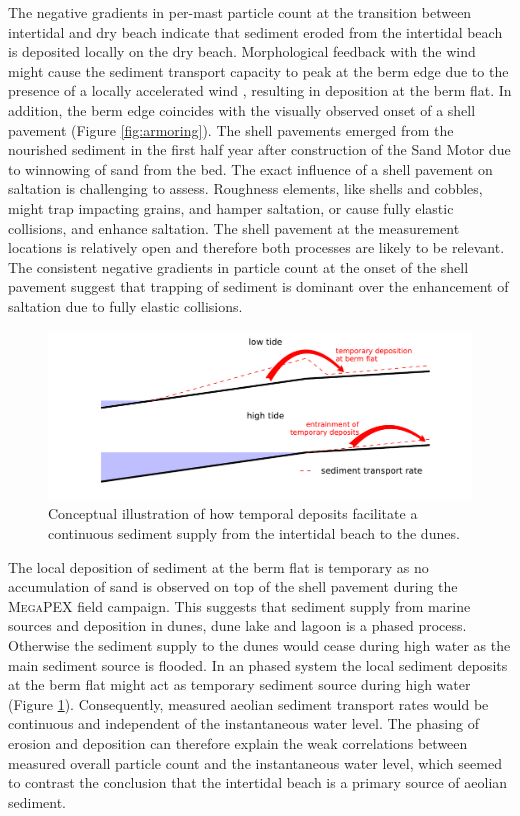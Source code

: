 The negative gradients in per-mast particle count at the transition
between intertidal and dry beach indicate that sediment eroded from
the intertidal beach is deposited locally on the dry
beach. Morphological feedback with the wind might cause
the sediment transport capacity to peak at the berm edge due to the
presence of a locally accelerated wind \citep[i.e. jet
flow;][]{Hesp2016}, resulting in deposition at the berm flat. In
addition, the berm edge coincides with the visually observed onset of
a shell pavement (Figure \ref{fig:armoring}).  The shell
pavements emerged from the nourished sediment in the first half year
after construction of the Sand Motor \citep{Hoonhout2017a} due to
winnowing of sand from the bed. The exact influence of a shell
pavement on saltation is challenging to assess. Roughness elements,
like shells and cobbles, might trap impacting grains, and hamper
saltation, or cause fully elastic collisions, and enhance
saltation. The shell pavement at the measurement locations is
relatively open and therefore both processes are likely to be
relevant. The consistent negative gradients in particle count at the
onset of the shell pavement suggest that trapping of sediment is
dominant over the enhancement of saltation due to fully elastic
collisions.

\begin{figure}
 \centering
  \includegraphics[width=\columnwidth]{../Figures/temporal_deposits}
  \caption{Conceptual illustration of how temporal deposits facilitate
    a continuous sediment supply from the intertidal beach to the
    dunes.}
  \label{fig:temporal_deposits}
\end{figure}

The local deposition of sediment at the berm flat is temporary as no
accumulation of sand is observed on top of the shell pavement during
the \textsc{MegaPEX} field campaign. This suggests that sediment
supply from marine sources and deposition in dunes, dune lake and
lagoon is a phased process. Otherwise the sediment supply to the dunes
would cease during high water as the main sediment source is
flooded. In an phased system the local sediment deposits at the berm
flat might act as temporary sediment source during high water (Figure
\ref{fig:temporal_deposits}). Consequently, measured aeolian sediment
transport rates would be continuous and independent of the
instantaneous water level. The phasing of erosion and deposition can
therefore explain the weak correlations between measured overall
particle count and the instantaneous water level, which seemed to
contrast the conclusion that the intertidal beach is a primary source
of aeolian sediment.

